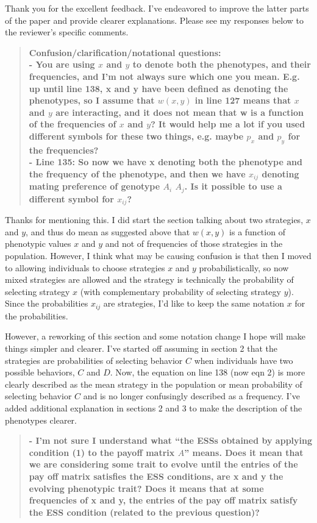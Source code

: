 \documentclass[10pt,parskip=full,foldmarks=off,addrfield=off,backaddress=false,refline=dateleft,letterpaper]{scrlttr2}
\newenvironment{reviewerquote}{\begin{quote}\color{DarkBlue}\bfseries}{\end{quote}}
\begin{document}
\begin{letter}
Thank you for the excellent feedback. I've endeavored to improve the latter parts of the paper and provide clearer explanations. Please see my responses below to the reviewer's specific comments.

\begin{reviewerquote}
Confusion/clarification/notational questions:\\
- You are using $x$ and $y$ to denote both the phenotypes, and their frequencies, and I’m not always sure which one you mean. E.g. up until line 138, x and y have been defined as denoting the phenotypes, so I assume that $w(x,y)$ in line 127 means that $x$ and $y$ are interacting, and it does not mean that w is a function of the frequencies of $x$ and $y$? It would help me a lot if you used different symbols for these two things, e.g. maybe $p_x$ and $p_y$ for the frequencies?\\
- Line 135: So now we have x denoting both the phenotype and the frequency of the phenotype, and then we have $x_{ij}$ denoting mating preference of genotype $A_i$ $A_j$. Is it possible to use a different symbol for $x_{ij}$?
\end{reviewerquote}

Thanks for mentioning this. I did start the section talking about two strategies, $x$ and $y$, and thus do mean as suggested above that $w(x,y)$  is a function of phenotypic values $x$ and $y$ and not of frequencies of those strategies in the population. However, I think what may be causing confusion is that then I moved to allowing individuals to choose strategies $x$ and $y$ probabilistically, so now mixed strategies are allowed and the strategy is technically the probability of selecting strategy $x$ (with complementary probability of selecting strategy $y$). Since the probabilities $x_{ij}$ are strategies, I'd like to keep the same notation $x$ for the probabilities.

However, a reworking of this section and some notation change I hope will make things simpler and clearer. I've started off assuming in section 2 that the strategies are probabilities of selecting behavior $C$ when individuals have two possible behaviors, $C$ and $D$. Now, the equation on line 138 (now eqn 2) is more clearly described as the mean strategy in the population or mean probability of selecting behavior $C$ and is no longer confusingly described as a frequency. I've added additional explanation in sections 2 and 3 to make the description of the phenotypes clearer.

\begin{reviewerquote}
- I’m not sure I understand what “the ESSs obtained by applying condition (1) to the payoff matrix $A$” means. Does it mean that we are considering some trait to evolve until the entries of the pay off matrix satisfies the ESS conditions, are x and y the evolving phenotypic trait? Does it means that at some frequencies of x and y, the entries of the pay off matrix satisfy the ESS condition (related to the previous question)?
\end{reviewerquote}


\end{letter}
\end{document}

